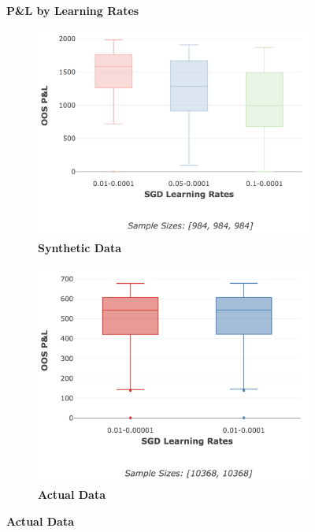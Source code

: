 \documentclass[a4paper,11pt,oneside]{article}
\theoremstyle{plain}
\theoremstyle{definition}
\begin{document}
		\begin{figure}[H]
		\centering
		\textbf{P\&L by Learning Rates}
		\begin{subfigure}{.5\textwidth}
			\centering 
			\includegraphics[scale=0.3]{images/results/8_appendix/synth_pl_minmax_lr.png}
			\caption{\textbf{Synthetic Data} 
				\newline }
			\label{figure-synth_pl_minmax_lr}
		\end{subfigure}%
		\begin{subfigure}{.5\textwidth}
			\centering 
			\includegraphics[scale=0.3]{images/results/8_appendix/actual_pl_minmax_lr.png}
			\caption{\textbf{Actual Data} 
}
\end{subfigure}
\end{figure}
\end{document}
